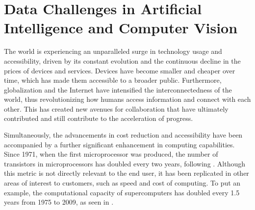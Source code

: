
\section{Data Challenges in Artificial Intelligence and Computer Vision}

The world is experiencing an unparalleled surge in technology usage and accessibility, driven by its constant evolution and the continuous decline in the prices of devices and services. Devices have become smaller and cheaper over time, which has made them accessible to a broader public. Furthermore, globalization and the Internet have intensified the interconnectedness of the world, thus revolutionizing how humans access information and connect with each other. This has created new avenues for collaboration that have ultimately contributed and still contribute to the acceleration of progress.


Simultaneously, the advancements in cost reduction and accessibility have been accompanied by a further significant enhancement in computing capabilities. Since 1971, when the first microprocessor was produced, the number of transistors in microprocessors has doubled every two years, following . Although this metric is not directly relevant to the end user, it has been replicated in other areas of interest to customers, such as speed and cost of computing. To put an example, the computational capacity of supercomputers has doubled every 1.5 years from 1975 to 2009, as seen in .

